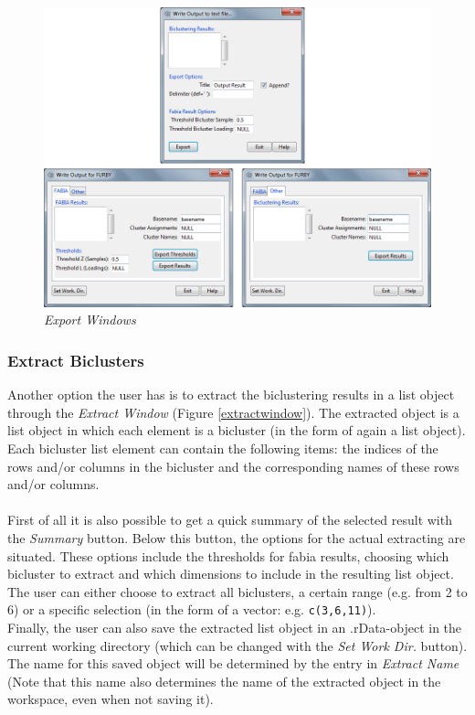 \documentclass[a4paper]{article}\usepackage[]{graphicx}\usepackage[]{color}
\begin{document}
\begin{figure}[H]
\centering
\includegraphics[scale=0.5]{figures/exportwindows.png}
\caption{{\it Export Windows}\label{exportwindows}}
\end{figure}

\subsubsection{Extract Biclusters}
\noindent Another option the user has is to extract the biclustering results in
a list object through the {\it Extract Window} (Figure \ref{extractwindow}). The extracted
object is a list object in which each element is a bicluster (in the form of again a list
object). Each bicluster list element can contain the following items: the
indices of the rows and/or columns in the bicluster and the corresponding names
of these rows and/or columns.
\\ \\
First of all it is also possible to get a quick summary of the selected result
with the {\it Summary} button. Below this button, the options for the actual
extracting are situated. These options include the thresholds for fabia results,
choosing which bicluster to extract and which dimensions to include in the
resulting list object. The user can either choose to extract all biclusters, a
certain range (e.g. from 2 to 6) or a specific selection (in the form of a
vector: e.g. \verb|c(3,6,11)|).\\
Finally, the user can also save the extracted list object in an .rData-object in
the current working directory (which can be changed with the {\it Set Work Dir.}
button). The name for this saved object will be determined by the entry in {\it
Extract Name} (Note that this name also determines the name of the extracted
object in the workspace, even when not saving it).
\end{document}
